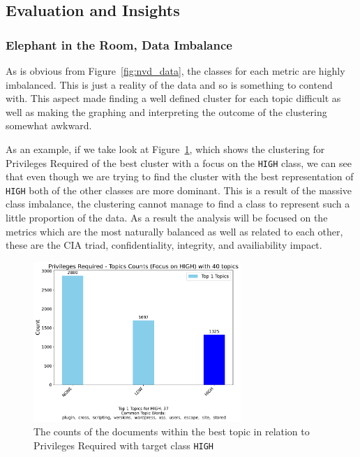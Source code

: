 \documentclass[12pt]{article}
\begin{document}
\subsection{Evaluation and Insights}

\subsubsection*{Elephant in the Room, Data Imbalance}

As is obvious from Figure~\ref{fig:nvd_data}, the classes for each metric are highly imbalanced.
This is just a reality of the data and so is something to contend with. This aspect
made finding a well defined cluster for each topic difficult as well as making the graphing and
interpreting the outcome of the clustering somewhat awkward.

As an example, if we take look at Figure~\ref{fig:priviledgesRequired_BAD}, which shows the
clustering for Privileges Required  of the best cluster with a focus on the \texttt{HIGH} class, we
can see that even though we are trying to find the cluster with the best representation of
\texttt{HIGH} both of the other classes are more dominant. This is a result of the massive class
imbalance, the clustering cannot manage to find a class to represent such a little proportion of the
data. As a result the analysis will be focused on the metrics which are the most naturally balanced
as well as related to each other, these are the CIA triad, confidentiality, integrity, and availiability
impact.

\begin{figure}[h!]
	\centering
	\includegraphics[width=0.7\textwidth]{figures/privilegesRequired/merged_top_k_topics_category_focus_counts_privilegesRequired_HIGH_k1.pdf}

	\caption{The counts of the documents within the best topic in relation to Privileges Required with
		target class \texttt{HIGH}}

	\label{fig:priviledgesRequired_BAD}
\end{figure}
\end{document}
